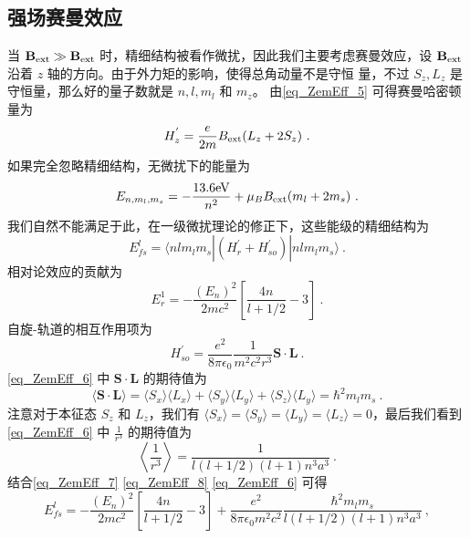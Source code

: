 \subsection{强场赛曼效应}
当 $\mathbf{B}_{\rm{ext}}\gg \mathbf{B}_{\rm{ext}}$ 时，精细结构被看作微扰，因此我们主要考虑赛曼效应，设 $\mathbf{B}_{\rm{ext}}$ 沿着 $z$ 轴的方向。由于外力矩的影响，使得总角动量不是守恒
量，不过 $S_z,L_z$ 是守恒量，那么好的量子数就是 $n,l,m_l$ 和 $m_z$。 由\autoref{eq_ZemEff_5} 可得赛曼哈密顿量为
\begin{equation}\label{eq_ZemEff_12}
H_z^{'} = \frac{e}{2m}B_{\rm{ext}}(L_z+2S_z)~.
\end{equation}
如果完全忽略精细结构，无微扰下的能量为
\begin{equation}\label{eq_ZemEff_7}
E_{n,m_l,m_s}=-\frac{13.6\rm{eV}}{n^2}+\mu_B B_{\rm{ext}}(m_l+2m_s)~.
\end{equation}
我们自然不能满足于此，在一级微扰理论的修正下，这些能级的精细结构为
\begin{equation}\label{eq_ZemEff_8}
E_{fs}^l=\langle nlm_lm_s|(H^{'}_r+H^{'}_{so})|nlm_lm_s\rangle~.
\end{equation}
相对论效应的贡献为
\begin{equation}\label{eq_ZemEff_6}
E_r^1=-\frac{(E_n)^2}{2mc^2}\left[\frac{4n}{l+1/2}-3\right]~.
\end{equation}
自旋-轨道的相互作用项为
\begin{equation}
H^{'}_{so}=\frac{e^2}{8\pi\epsilon_0}\frac{1}{m^2c^2r^3}\mathbf{S\cdot L}~.
\end{equation}
\autoref{eq_ZemEff_6} 中 $\mathbf{S\cdot L}$ 的期待值为
\begin{equation}
\langle \mathbf{S\cdot L} \rangle=\langle S_x\rangle\langle L_x\rangle+\langle S_y\rangle\langle L_y\rangle+\langle S_z\rangle\langle L_y\rangle=\hbar^2
m_lm_s~.\end{equation}
注意对于本征态 $S_z$ 和 $L_z$，我们有 $\langle S_x\rangle=\langle S_y\rangle=\langle L_y\rangle=\langle L_z\rangle=0$，最后我们看到\autoref{eq_ZemEff_6} 中 $\frac{1}{r^3}$ 的期待值为
\begin{equation}\label{eq_ZemEff_11}
\left\langle\frac{1}{r^3}\right\rangle=\frac{1}{l(l+1/2)(l+1)n^3a^3}~.
\end{equation}
结合\autoref{eq_ZemEff_7} \autoref{eq_ZemEff_8} \autoref{eq_ZemEff_6} 可得
\begin{equation}\label{eq_ZemEff_9}
E_{fs}^l= -\frac{(E_n)^2}{2mc^2}\left[\frac{4n}{l+1/2}-3\right]+\frac{e^2}{8\pi\epsilon_0m^2c^2}\frac{\hbar^2
m_lm_s}{l(l+1/2)(l+1)n^3a^3}~,
\end{equation}
